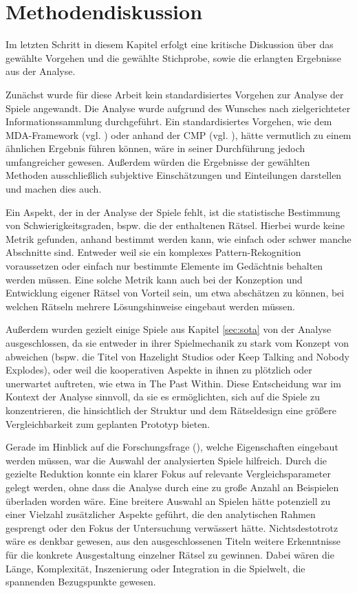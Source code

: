 \section{Methodendiskussion}\label{sec:analysis-discussion}
Im letzten Schritt in diesem Kapitel erfolgt eine kritische Diskussion über das gewählte Vorgehen und die gewählte Stichprobe, sowie die erlangten Ergebnisse aus der Analyse.

Zunächst wurde für diese Arbeit kein standardisiertes Vorgehen zur Analyse der Spiele angewandt. Die Analyse wurde aufgrund des Wunsches nach zielgerichteter Informationssammlung durchgeführt. Ein standardisiertes Vorgehen, wie dem \ac{MDA}-Framework (vgl. \cite{hunicke_mda_2004}) oder anhand der \ac{CMP} (vgl. \cite{seif_el-nasr_understanding_2010}), hätte vermutlich zu einem ähnlichen Ergebnis führen können, wäre in seiner Durchführung jedoch umfangreicher gewesen.
Außerdem würden die Ergebnisse der gewählten Methoden ausschließlich subjektive Einschätzungen und Einteilungen darstellen und machen dies auch.

Ein Aspekt, der in der Analyse der Spiele fehlt, ist die statistische Bestimmung von Schwierigkeitsgraden, bspw. die der enthaltenen Rätsel. Hierbei wurde keine Metrik gefunden, anhand bestimmt werden kann, wie einfach oder schwer manche Abschnitte sind. Entweder weil sie ein komplexes Pattern-Rekognition voraussetzen oder einfach nur bestimmte Elemente im Gedächtnis behalten werden müssen. Eine solche Metrik kann auch bei der Konzeption und Entwicklung eigener Rätsel von Vorteil sein, um etwa abschätzen zu können, bei welchen Rätseln mehrere Lösungshinweise eingebaut werden müssen.

Außerdem wurden gezielt einige Spiele aus Kapitel \ref{sec:sota} von der Analyse ausgeschlossen, da sie entweder in ihrer Spielmechanik zu stark vom Konzept von  abweichen (bspw. die Titel von Hazelight Studios oder Keep Talking and Nobody Explodes), oder weil die kooperativen Aspekte in ihnen zu plötzlich oder unerwartet auftreten, wie etwa in The Past Within. Diese Entscheidung war im Kontext der Analyse sinnvoll, da sie es ermöglichten, sich auf die Spiele zu konzentrieren, die hinsichtlich der Struktur und dem Rätseldesign eine größere Vergleichbarkeit zum geplanten Prototyp bieten.

Gerade im Hinblick auf die Forschungsfrage (), welche Eigenschaften eingebaut werden müssen, war die Auswahl der analysierten Spiele hilfreich. Durch die gezielte Reduktion konnte ein klarer Fokus auf relevante Vergleichsparameter gelegt werden, ohne dass die Analyse durch eine zu große Anzahl an Beispielen überladen worden wäre. Eine breitere Auswahl an Spielen hätte potenziell zu einer Vielzahl zusätzlicher Aspekte geführt, die den analytischen Rahmen gesprengt oder den Fokus der Untersuchung verwässert hätte.
Nichtsdestotrotz wäre es denkbar gewesen, aus den ausgeschlossenen Titeln weitere Erkenntnisse für die konkrete Ausgestaltung einzelner Rätsel zu gewinnen. Dabei wären die Länge, Komplexität, Inszenierung oder Integration in die Spielwelt, die spannenden Bezugspunkte gewesen. 

